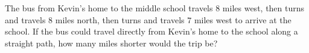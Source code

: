 The bus from Kevin's home to the middle school travels $8$ miles west, then turns and travels $8$ miles north, then turns and travels $7$ miles west to arrive at the school. If the bus could travel directly from Kevin's home to the school along a straight path, how many miles shorter would the trip be?
